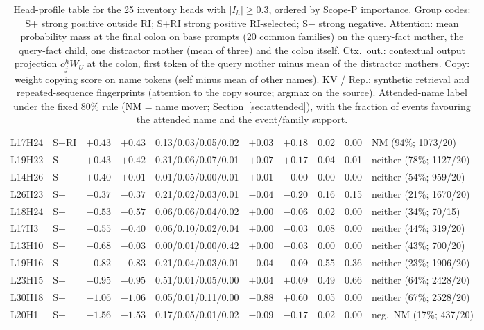 \begin{table}[p]
\begin{tabular}{llrrlrrrrl}
L17H24 & S+RI & $+0.43$ & $+0.43$ & 0.13/0.03/0.05/0.02 & $+0.03$ & $+0.18$ & 0.02 & 0.00 & NM (94\%; 1073/20) \\
L19H22 & S+ & $+0.43$ & $+0.42$ & 0.31/0.06/0.07/0.01 & $+0.07$ & $+0.17$ & 0.04 & 0.01 & neither (78\%; 1127/20) \\
L14H26 & S+ & $+0.40$ & $+0.01$ & 0.01/0.05/0.00/0.01 & $+0.01$ & $-0.00$ & 0.00 & 0.00 & neither (54\%; 959/20) \\
L26H23 & S$-$ & $-0.37$ & $-0.37$ & 0.21/0.02/0.03/0.01 & $-0.04$ & $-0.20$ & 0.16 & 0.15 & neither (21\%; 1670/20) \\
L18H24 & S$-$ & $-0.53$ & $-0.57$ & 0.06/0.06/0.04/0.02 & $+0.00$ & $-0.06$ & 0.02 & 0.00 & neither (34\%; 70/15) \\
L17H3 & S$-$ & $-0.55$ & $-0.40$ & 0.06/0.10/0.02/0.04 & $+0.00$ & $-0.03$ & 0.08 & 0.00 & neither (44\%; 319/20) \\
L13H10 & S$-$ & $-0.68$ & $-0.03$ & 0.00/0.01/0.00/0.42 & $+0.00$ & $-0.03$ & 0.00 & 0.00 & neither (43\%; 700/20) \\
L19H16 & S$-$ & $-0.82$ & $-0.83$ & 0.21/0.04/0.03/0.01 & $-0.04$ & $-0.09$ & 0.55 & 0.36 & neither (23\%; 1906/20) \\
L23H15 & S$-$ & $-0.95$ & $-0.95$ & 0.51/0.01/0.05/0.00 & $+0.04$ & $+0.09$ & 0.49 & 0.66 & neither (64\%; 2428/20) \\
L30H18 & S$-$ & $-1.06$ & $-1.06$ & 0.05/0.01/0.11/0.00 & $-0.88$ & $+0.60$ & 0.05 & 0.00 & neither (67\%; 2528/20) \\
L20H1 & S$-$ & $-1.56$ & $-1.53$ & 0.17/0.05/0.01/0.02 & $-0.09$ & $-0.17$ & 0.02 & 0.00 & neg.\ NM (17\%; 437/20) \\
\bottomrule
\end{tabular}
\caption{Head-profile table for the 25 inventory heads with $|I_h|\ge 0.3$, ordered by Scope-P importance. Group codes: S+ strong positive outside RI; S+RI strong positive RI-selected; S$-$ strong negative. Attention: mean probability mass at the final colon on base prompts (20 common families) on the query-fact mother, the query-fact child, one distractor mother (mean of three) and the colon itself. Ctx.\ out.: contextual output projection $o^h_j W_U$ at the colon, first token of the query mother minus mean of the distractor mothers. Copy: weight copying score on name tokens (self minus mean of other names). KV / Rep.: synthetic retrieval and repeated-sequence fingerprints (attention to the copy source; argmax on the source). Attended-name label under the fixed 80\% rule (NM = name mover; Section~\ref{sec:attended}), with the fraction of events favouring the attended name and the event/family support.}
\label{tab:profiles}
\end{table}
